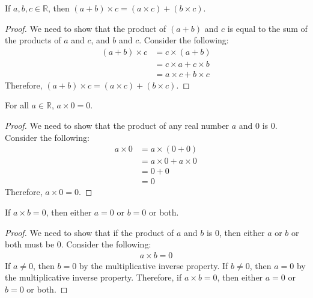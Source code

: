 \documentclass[11pt]{article}
\begin{document}
\begin{proposition}
	If $a, b, c \in \mathbb{R}$, then $(a + b) \times c = (a \times c) + (b \times c)$.
\end{proposition}

\begin{proof}
	We need to show that the product of $(a + b)$ and $c$ is equal to the sum of the products of $a$ and $c$, and $b$ and $c$. Consider the following:
	\begin{align*}
		(a + b) \times c & = c \times (a + b)        \\
		                 & = c \times a + c \times b \\
		                 & = a \times c + b \times c
	\end{align*}
	Therefore, $(a + b) \times c = (a \times c) + (b \times c)$.
\end{proof}

\begin{proposition}
	For all $a \in \mathbb{R}$, $a \times 0 = 0$.
\end{proposition}

\begin{proof}
	We need to show that the product of any real number $a$ and $0$ is $0$. Consider the following:
	\begin{align*}
		a \times 0 & = a \times (0 + 0)        \\
		           & = a \times 0 + a \times 0 \\
		           & = 0 + 0                   \\
		           & = 0
	\end{align*}
	Therefore, $a \times 0 = 0$.
\end{proof}

\begin{proposition}
	If $a \times b = 0$, then either $a = 0$ or $b = 0$ or both.
\end{proposition}

\begin{proof}
	We need to show that if the product of $a$ and $b$ is $0$, then either $a$ or $b$ or both must be $0$. Consider the following:
	\begin{align*}
		a \times b = 0
	\end{align*}
	If $a \neq 0$, then $b = 0$ by the multiplicative inverse property. If $b \neq 0$, then $a = 0$ by the multiplicative inverse property. Therefore, if $a \times b = 0$, then either $a = 0$ or $b = 0$ or both.
\end{proof}
\end{document}
